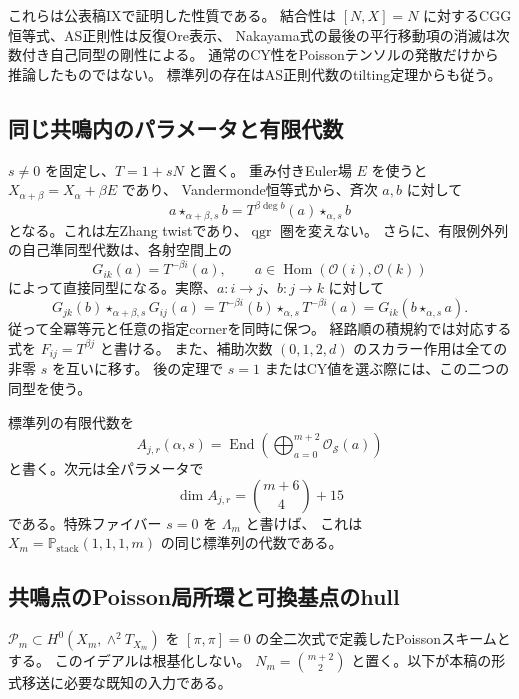 これらは公表稿IX\cite[非線形アフィン量子化の節]{VKPoisson34}で証明した性質である。
結合性は $[N,X]=N$ に対するCGG恒等式、AS正則性は反復Ore表示、
Nakayama式の最後の平行移動項の消滅は次数付き自己同型の剛性による。
通常のCY性をPoissonテンソルの発散だけから推論したものではない。
標準列の存在はAS正則代数のtilting定理\cite{MinamotoMori2011}からも従う。

\subsection{同じ共鳴内のパラメータと有限代数}

$s\ne0$ を固定し、$T=1+sN$ と置く。
重み付きEuler場 $E$ を使うと $X_{\alpha+\beta}=X_\alpha+\beta E$ であり、
Vandermonde恒等式から、斉次 $a,b$ に対して
\[
 a\star_{\alpha+\beta,s}b
       =T^{\beta\deg b}(a)\star_{\alpha,s}b
\]
となる。これは左Zhang twistであり、$\operatorname{qgr}$ 圏を変えない。
さらに、有限例外列の自己準同型代数は、各射空間上の
\begin{equation}
 G_{ik}(a)=T^{-\beta i}(a),\qquad
 a\in\operatorname{Hom}(\mathcal O(i),\mathcal O(k))
 \label{eq:finite-twist-iso-v35}
\end{equation}
によって直接同型になる。実際、$a:i\to j$、$b:j\to k$ に対して
\[
 G_{jk}(b)\star_{\alpha+\beta,s}G_{ij}(a)
 =T^{-\beta i}(b)\star_{\alpha,s}T^{-\beta i}(a)
 =G_{ik}(b\star_{\alpha,s}a).
\]
従って全冪等元と任意の指定cornerを同時に保つ。
経路順の積規約では対応する式を $F_{ij}=T^{\beta j}$ と書ける。
また、補助次数 $(0,1,2,d)$ のスカラー作用は全ての非零 $s$ を互いに移す。
後の定理で $s=1$ またはCY値を選ぶ際には、この二つの同型を使う。

標準列の有限代数を
\[
 A_{j,r}(\alpha,s)=\operatorname{End}\left(
                 \bigoplus_{a=0}^{m+2}\mathcal O_{\mathcal S}(a)\right)
\]
と書く。次元は全パラメータで
\[
 \dim A_{j,r}=\binom{m+6}{4}+15
\]
である。特殊ファイバー $s=0$ を $\Lambda_m$ と書けば、
これは $X_m=\mathbb P_{\mathrm{stack}}(1,1,1,m)$ の同じ標準列の代数である。

\subsection{共鳴点のPoisson局所環と可換基点のhull}

$\mathscr P_m\subset H^0(X_m,\wedge^2T_{X_m})$ を
$[\pi,\pi]=0$ の全二次式で定義したPoissonスキームとする。
このイデアルは根基化しない。
$N_m=\binom{m+2}{2}$ と置く。以下が本稿の形式移送に必要な既知の入力である。

